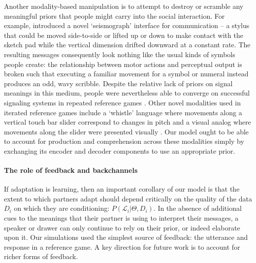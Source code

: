 
Another modality-based manipulation is to attempt to destroy or scramble any meaningful priors that people might carry into the social interaction.
For example,  introduced a novel `seismograph' interface for communication -- a stylus that could be moved side-to-side or lifted up or down to make contact with the sketch pad while the vertical dimension drifted downward at a constant rate.
The resulting messages consequently look nothing like the usual kinds of symbols people create: the relationship between motor actions and perceptual output is broken such that executing a familiar movement for a symbol or numeral instead produces an odd, wavy scribble.
Despite the relative lack of priors on signal meanings in this medium, people were nevertheless able to converge on successful signaling systems in repeated reference games \cite{RobertsGalantucci12_DualityOfPatterning,RobertsEtAl15_IconocityOnCombinatoriality}.
Other novel modalities used in iterated reference games include a `whistle' language where movements along a vertical touch bar slider correspond to changes in pitch \cite{VerhoefRobertsDingemanse15_Iconicity} and a visual analog where movements along the slider were presented visually \cite{VerhoefEtAl16_TemporalLanguage}.
Our model ought to be able to account for production and comprehension across these modalities simply by exchanging its encoder and decoder components to use an appropriate prior.

\paragraph{The role of feedback and backchannels}

If adaptation is learning, then an important corollary of our model is that the extent to which partners adapt should depend critically on the quality of the data $D_i$ on which they are conditioning: $P(\mathcal{L}_i | \Theta, D_i)$. In the absence of additional cues to the meanings that their partner is using to interpret their messages, a speaker or drawer can only continue to rely on their prior, or indeed elaborate upon it. 
Our simulations used the simplest source of feedback: the utterance and response in a reference game.
A key direction for future work is to account for richer forms of feedback.

